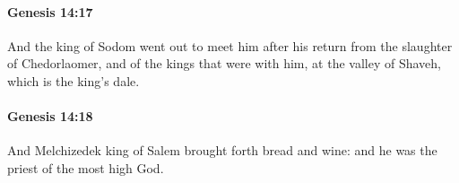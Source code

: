 		\paragraph{Genesis 14:17} %
			\label{GENESIS-14-17}

			And the king of Sodom went out to meet him after his return from the slaughter of Chedorlaomer, and of the kings that were with him, at the valley of Shaveh, which is the king's dale.


		\paragraph{Genesis 14:18} %
			\label{GENESIS-14-18}

			And Melchizedek king of Salem brought forth bread and wine: and he was the priest of the most high God.


